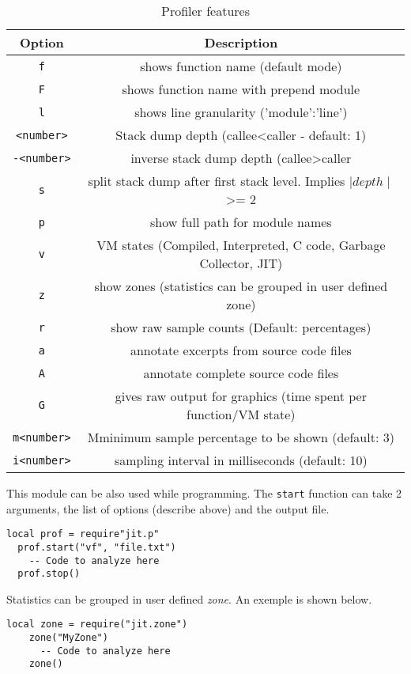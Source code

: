 \begin{table}[H]
\centering
\begin{tabular}{ |c|c| } 
 \hline
 Option & Description \\
 \hline
 \texttt{f} & shows function name (default mode)\\
 \texttt{F} & shows function name with prepend module \\
 \texttt{l} & shows line granularity ('module':'line')\\
 \texttt{\textless number\textgreater} & Stack dump depth (callee\textless caller - default: 1)\\
 \texttt{-\textless number\textgreater} & inverse stack dump depth (callee\textgreater caller\\
 \texttt{s} & split stack dump after first stack level. Implies $\mid depth\mid$ \textgreater= 2\\
 \texttt{p} & show full path for module names\\
 \texttt{v} & VM states (Compiled, Interpreted, C code, Garbage Collector, JIT)\\
 \texttt{z} & show zones (statistics can be grouped in user defined zone)\\
 \texttt{r} & show raw sample counts (Default: percentages)\\
 \texttt{a} &  annotate excerpts from source code files\\
 \texttt{A} & annotate complete source code files\\
 \texttt{G} & gives raw output for graphics (time spent per function/VM state)\\
 \texttt{m\textless number\textgreater} & Mminimum sample percentage to be shown (default: 3)\\
 \texttt{i\textless number\textgreater} & sampling interval in milliseconds (default: 10)\\
 \hline
\end{tabular}
\caption{Profiler features}
\end{table}

\noindent
This module can be also used while programming. The \texttt{start} function can take 2 arguments, the list of options (describe above) and the output file.
\begin{lstlisting}[style=CommandsLuaJIT]
  local prof = require"jit.p"
  prof.start("vf", "file.txt")
    -- Code to analyze here
  prof.stop()
\end{lstlisting}

\noindent
Statistics can be grouped in user defined \textit{zone}. An exemple is shown  below.
\begin{lstlisting}[style=CommandsLuaJIT]
    local zone = require("jit.zone")
    zone("MyZone")
      -- Code to analyze here
    zone()
\end{lstlisting}

